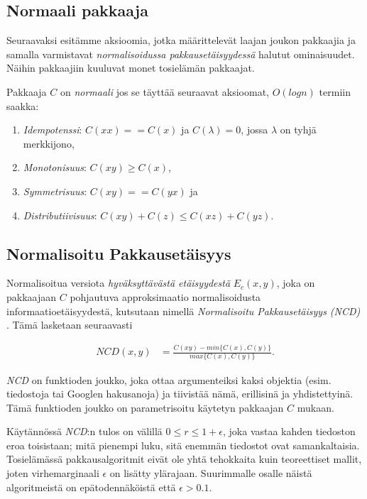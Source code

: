 \documentclass[11pt,finnish]{tktltiki2}
\theoremstyle{definition}
\theoremstyle{remark}
\begin{document}
\subsection{Normaali pakkaaja} %
\label{sub:normaali_pakkaaja}

  Seuraavaksi esitämme aksioomia, jotka määrittelevät laajan joukon pakkaajia ja samalla varmistavat \emph{normalisoidussa pakkausetäisyydessä} halutut ominaisuudet. Näihin pakkaajiin kuuluvat monet tosielämän pakkaajat.

  Pakkaaja $C$ on \emph{normaali} jos se täyttää seuraavat aksioomat, $O(log n)$ termiin saakka:

  \begin{enumerate}
    \item \emph{Idempotenssi}: $C(xx) == C(x)$ ja $C(\lambda) = 0$, jossa $\lambda$ on tyhjä merkkijono,
    \item \emph{Monotonisuus}: $C(xy) \geq C(x)$,
    \item \emph{Symmetrisuus}: $C(xy) == C(yx)$ ja
    \item \emph{Distributiivisuus}: $C(xy) + C(z) \leq C(xz) + C(yz)$.
  \end{enumerate}

\subsection{Normalisoitu Pakkausetäisyys} %
\label{sub:normalisoitu_pakkauset_isyys}

  Normalisoitua versiota \emph{hyväksyttävästä etäisyydestä} $E_c(x,y)$, joka on pakkaajaan $C$ pohjautuva approksimaatio normalisoidusta informaatioetäisyydestä, kutsutaan nimellä \emph{Normalisoitu Pakkausetäisyys (NCD)} \cite{CV05}. Tämä lasketaan seuraavasti

  \begin{align}
    NCD(x,y) &= \frac{C(xy)-min\{C(x),C(y)\}}{max\{C(x),C(y)\}}.
  \end{align}

  \emph{NCD} on funktioden joukko, joka ottaa argumenteiksi kaksi objektia (esim. tiedostoja tai Googlen hakusanoja) ja tiivistää nämä, erillisinä ja yhdistettyinä. Tämä funktioden joukko on parametrisoitu käytetyn pakkaajan $C$ mukaan.

  Käytännössä \emph{NCD}:n tulos on välillä $0 \leq r \leq 1+ \epsilon$, joka vastaa kahden tiedoston eroa toisistaan; mitä pienempi luku, sitä enemmän tiedostot ovat samankaltaisia. Tosielämässä pakkausalgoritmit eivät ole yhtä tehokkaita kuin teoreettiset mallit, joten virhemarginaali $\epsilon$ on lisätty ylärajaan. Suurimmalle osalle näistä algoritmeistä on epätodennäköistä että  $\epsilon > 0.1$.
\end{document}
